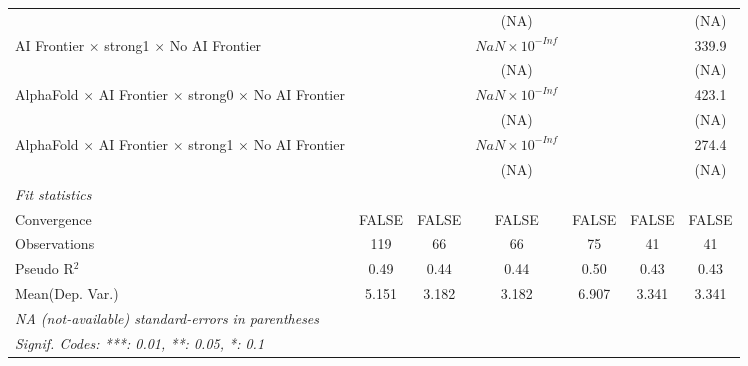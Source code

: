 \begin{tabular}{lcccccc}
                                                                              &                        &                        & (NA)                   &         &        & (NA)\\   
   AI Frontier $\times$ strong1 $\times$ No AI Frontier                       &                        &                        & $NaN\times 10^{-Inf}$  &         &        & 339.9\\   
                                                                              &                        &                        & (NA)                   &         &        & (NA)\\   
   AlphaFold $\times$ AI Frontier $\times$ strong0 $\times$ No AI Frontier    &                        &                        & $NaN\times 10^{-Inf}$  &         &        & 423.1\\   
                                                                              &                        &                        & (NA)                   &         &        & (NA)\\   
   AlphaFold $\times$ AI Frontier $\times$ strong1 $\times$ No AI Frontier    &                        &                        & $NaN\times 10^{-Inf}$  &         &        & 274.4\\   
                                                                              &                        &                        & (NA)                   &         &        & (NA)\\   
   \midrule
   \emph{Fit statistics}\\
   Convergence                                                                &FALSE                   & FALSE                  & FALSE                  & FALSE   & FALSE  & FALSE\\  
   Observations                                                               & 119                    & 66                     & 66                     & 75      & 41     & 41\\  
   Pseudo R$^2$                                                               & 0.49                   & 0.44                   & 0.44                   & 0.50    & 0.43   & 0.43\\  
Mean(Dep. Var.) & 5.151 & 3.182 & 3.182 & 6.907 & 3.341 & 3.341 \\
   \midrule \midrule
   \multicolumn{7}{l}{\emph{NA (not-available) standard-errors in parentheses}}\\
   \multicolumn{7}{l}{\emph{Signif. Codes: ***: 0.01, **: 0.05, *: 0.1}}\\
\end{tabular}
\par\endgroup

